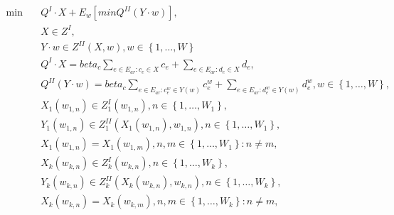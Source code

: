 \begin{align}
  \min\quad & Q^{I} \cdot X + E_{w} \left[min Q^{II} \left(Y \cdot w\right)\right] , \tag{eq\_0001} \\
  & X \in Z^{I} , \tag{eq\_0003} \\
  & Y \cdot w \in Z^{II} \left(X , w\right) , w \in \left\{1 , \ldots , W\right\} \tag{eq\_0004} \\
  & Q^{I} \cdot X = \mathit{beta}_{c} \sum_{e \in E_{ar} : c_{e} \in X} c_{e} + \sum_{e \in E_{ar} : d_{e} \in X} d_{e} , \tag{eq\_0007} \\
  & Q^{II} \left(Y \cdot w\right) = \mathit{beta}_{c} \sum_{e \in E_{ar} : c_{e}^{w} \in Y \left(w\right)} c_{e}^{w} + \sum_{e \in E_{ar} : d_{e}^{w} \in Y \left(w\right)} d_{e}^{w} , w \in \left\{1 , \ldots , W\right\} , \tag{eq\_0009} \\
  & X_{1} \left(w_{1 , n}\right) \in Z_{1}^{I} \left(w_{1 , n}\right) , n \in \left\{1 , \ldots , W_{1}\right\} , \tag{eq\_0012} \\
  & Y_{1} \left(w_{1 , n}\right) \in Z_{1}^{II} \left(X_{1} \left(w_{1 , n}\right) , w_{1 , n}\right) , n \in \left\{1 , \ldots , W_{1}\right\} , \tag{eq\_0013} \\
  & X_{1} \left(w_{1 , n}\right) = X_{1} \left(w_{1 , m}\right) , n , m \in \left\{1 , \ldots , W_{1}\right\} : n \neq m , \tag{eq\_0014} \\
  & X_{k} \left(w_{k , n}\right) \in Z_{k}^{I} \left(w_{k , n}\right) , n \in \left\{1 , \ldots , W_{k}\right\} , \tag{eq\_0019} \\
  & Y_{k} \left(w_{k , n}\right) \in Z_{k}^{II} \left(X_{k} \left(w_{k , n}\right) , w_{k , n}\right) , n \in \left\{1 , \ldots , W_{k}\right\} , \tag{eq\_0020} \\
  & X_{k} \left(w_{k , n}\right) = X_{k} \left(w_{k , m}\right) , n , m \in \left\{1 , \ldots , W_{k}\right\} : n \neq m , \tag{eq\_0021} \\
\end{align}
